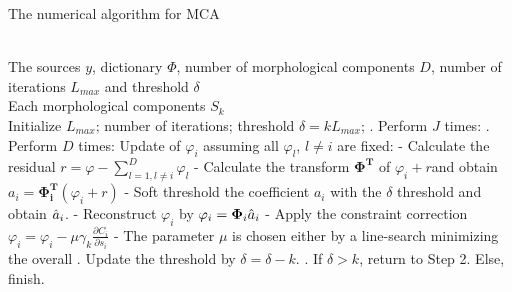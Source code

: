 \begin{algorithm}
\caption{The numerical algorithm for MCA} 
\label{algFramwork1} 
\begin{algorithmic} %
\REQUIRE ~~\\%
The sources $y$, dictionary $\Phi$, number of morphological components $D$, number of iterations $L_{max}$ and threshold $\delta$
\ENSURE ~~\\ %
Each morphological components $S_k$\\
\STATE Initialize $L_{max}$; number of iterations; threshold $ \delta= k L_{max}$;
. Perform $J$ times:
\STATE {}. Perform $D$ times:
\STATE \qquad \quad Update of $\varphi_i$ assuming all $\varphi_l$, $l \neq i$ are fixed:
\STATE \qquad \quad - Calculate the residual $r = \varphi − \sum_{l=1, l \neq i}^D \varphi_l$
\STATE \qquad \quad - Calculate the transform $\mathbf{\Phi^T}$ of $\varphi_i + r$and obtain $a_i = \mathbf{\Phi_i^T} (\varphi_i + r)$
\STATE \qquad \quad - Soft threshold the coefficient $a_i$ with the $\delta$ threshold and obtain $\Hat{a}_i$.
\STATE \qquad \quad - Reconstruct $\varphi_i$ by $\varphi_i = \mathbf{\Phi}_i \Hat{a}_i$
\STATE \qquad \quad - Apply the constraint correction $\varphi_i = \varphi_i - \mu \gamma_k \frac{\partial C_i}{\partial s_i}$
\STATE \qquad \quad - The parameter $\mu$ is chosen either by a line-search minimizing the overall 
. Update the threshold by $\delta = \delta - k$.
. If $\delta  > k$, return to Step 2. Else, finish.
\end{algorithmic}
\end{algorithm}

